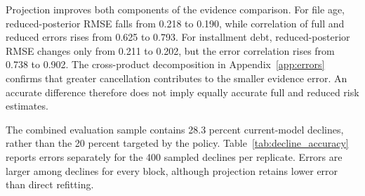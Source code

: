 Projection improves both components of the evidence comparison. For file age, reduced-posterior RMSE falls from 0.218 to 0.190, while correlation of full and reduced errors rises from 0.625 to 0.793. For installment debt, reduced-posterior RMSE changes only from 0.211 to 0.202, but the error correlation rises from 0.738 to 0.902. The cross-product decomposition in Appendix~\ref{app:errors} confirms that greater cancellation contributes to the smaller evidence error. An accurate difference therefore does not imply equally accurate full and reduced risk estimates.

The combined evaluation sample contains 28.3 percent current-model declines, rather than the 20 percent targeted by the policy. Table~\ref{tab:decline_accuracy} reports errors separately for the 400 sampled declines per replicate. Errors are larger among declines for every block, although projection retains lower error than direct refitting.
